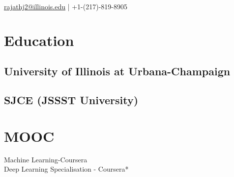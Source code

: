 \documentclass[]{deedy-resume-openfont}
\begin{document}
%
%


%
%

\vspace*{0.01}
{ 
\href{mailto:rajathj2@illinois.edu}{rajathj2@illinois.edu} | +1-(217)-819-8905
}

%
%

\begin{minipage}[t]{0.33\textwidth}


\section{Education} 

\subsection{University of Illinois at Urbana-Champaign}
\sectionsep
\vspace{5pt}
\subsection{SJCE (JSSST University)}
\sectionsep



\section{MOOC}
Machine Learning-Coursera \\
Deep Learning Specialisation - Coursera* \\
\sectionsep



\end{minipage}
\end{document}

